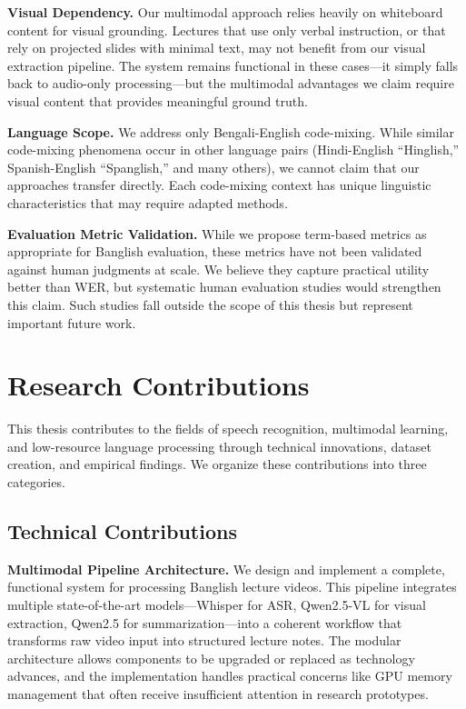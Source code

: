 \textbf{Visual Dependency.} Our multimodal approach relies heavily on whiteboard content for visual grounding. Lectures that use only verbal instruction, or that rely on projected slides with minimal text, may not benefit from our visual extraction pipeline. The system remains functional in these cases---it simply falls back to audio-only processing---but the multimodal advantages we claim require visual content that provides meaningful ground truth.

\textbf{Language Scope.} We address only Bengali-English code-mixing. While similar code-mixing phenomena occur in other language pairs (Hindi-English ``Hinglish,'' Spanish-English ``Spanglish,'' and many others), we cannot claim that our approaches transfer directly. Each code-mixing context has unique linguistic characteristics that may require adapted methods.

\textbf{Evaluation Metric Validation.} While we propose term-based metrics as appropriate for Banglish evaluation, these metrics have not been validated against human judgments at scale. We believe they capture practical utility better than WER, but systematic human evaluation studies would strengthen this claim. Such studies fall outside the scope of this thesis but represent important future work.

\section{Research Contributions}

This thesis contributes to the fields of speech recognition, multimodal learning, and low-resource language processing through technical innovations, dataset creation, and empirical findings. We organize these contributions into three categories.

\subsection{Technical Contributions}

\textbf{Multimodal Pipeline Architecture.} We design and implement a complete, functional system for processing Banglish lecture videos. This pipeline integrates multiple state-of-the-art models---Whisper for ASR, Qwen2.5-VL for visual extraction, Qwen2.5 for summarization---into a coherent workflow that transforms raw video input into structured lecture notes. The modular architecture allows components to be upgraded or replaced as technology advances, and the implementation handles practical concerns like GPU memory management that often receive insufficient attention in research prototypes.

